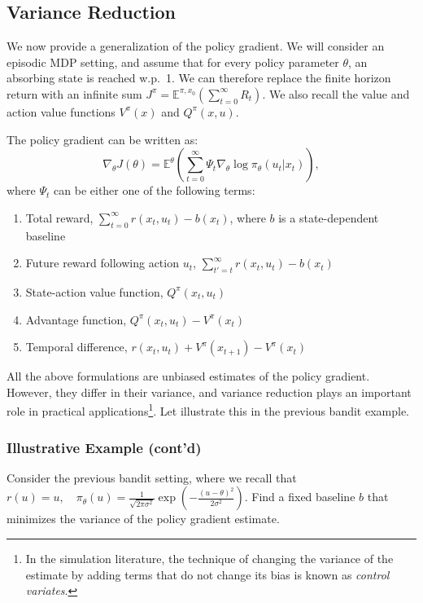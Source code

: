 \subsection{Variance Reduction}
We now provide a generalization of the policy gradient. We will consider an episodic MDP setting, and assume that for every policy parameter $\theta$, an absorbing state is reached w.p.~1. We can therefore replace the finite horizon return with an infinite sum ${J^\pi } = {\mathbb E^{\pi ,{x_0}}} \left(\sum\limits_{t = 0}^\infty {{R_t}} \right)$. We also recall the value and action value functions $V^\pi(x)$ and $Q^\pi(x,u)$. 
\begin{proposition}\label{prop:pg_control_variates}
The policy gradient can be written as:
\begin{equation*}
    \nabla_\theta J(\theta) = {\mathbb E^\theta }\left( \sum_{t=0}^\infty \Psi_t {{\nabla _\theta }\log {\pi _\theta }({u_t}|{x_t})} \right),
\end{equation*}
where $\Psi_t$ can be either one of the following terms:
\begin{enumerate}
    \item Total reward, $\sum_{t=0}^\infty r(x_t,u_t) - b(x_t)$, where $b$ is a state-dependent baseline
    \item Future reward following action $u_t$, $\sum_{t'=t}^\infty r(x_t,u_t) - b(x_t)$
    \item State-action value function, $Q^\pi(x_t,u_t)$
    \item Advantage function, $Q^\pi(x_t,u_t) - V^\pi(x_t)$
    \item Temporal difference, $r(x_t,u_t) + V^\pi(x_{t+1})- V^\pi(x_t)$
\end{enumerate}
\end{proposition}

All the above formulations are unbiased estimates of the policy gradient. However, they differ in their variance, and variance reduction plays an important role in practical applications\footnote{In the simulation literature, the technique of changing the variance of the estimate by adding terms that do not change its bias is known as \textit{control variates}.}. Let illustrate this in the previous bandit example.

\subsubsection{Illustrative Example (cont'd)}
Consider the previous bandit setting, where we recall that
$        r(u) = u, \quad
        \pi_\theta(u) = \frac{1}{\sqrt{2 \pi \sigma^2}} \exp (- \frac{(u - \theta)^2}{2 \sigma^2}).$
Find a fixed baseline $b$ that minimizes the variance of the policy gradient estimate.

